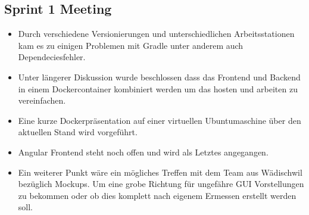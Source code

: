 \documentclass[../main.tex]{subfiles}
\begin{document}
	\subsection{Sprint 1 Meeting}
	\begin{itemize}
		\item Durch verschiedene Versionierungen und unterschiedlichen Arbeitsstationen kam es zu einigen Problemen mit Gradle unter anderem auch Dependeciesfehler.
		\item Unter längerer Diskussion wurde beschlossen dass das Frontend und Backend in einem Dockercontainer kombiniert werden um das hosten und arbeiten zu vereinfachen.
		\item Eine kurze Dockerpräsentation auf einer virtuellen Ubuntumaschine über den aktuellen Stand wird vorgeführt.
		\item Angular Frontend steht noch offen und wird als Letztes angegangen.
		\item Ein weiterer Punkt wäre ein mögliches Treffen mit dem Team aus Wädischwil bezüglich Mockups. Um eine grobe Richtung für ungefähre GUI Vorstellungen zu bekommen oder ob dies komplett nach eigenem Ermessen erstellt werden soll.
	\end{itemize}	
\end{document}
